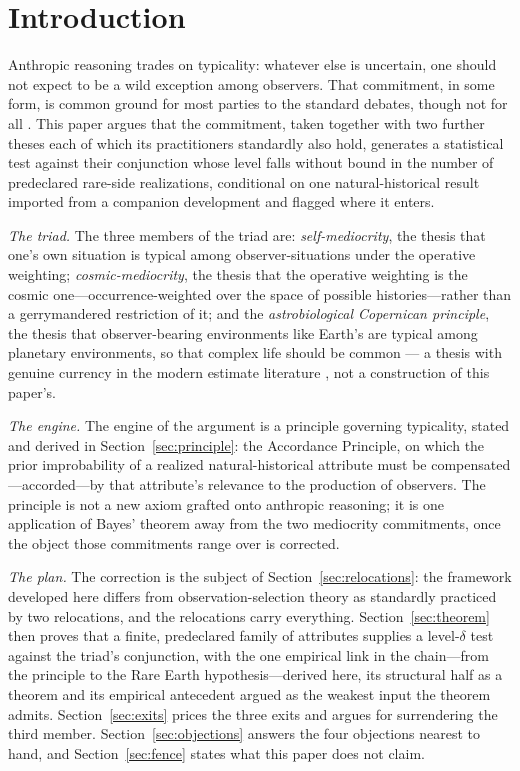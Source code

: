 \section{Introduction}
\label{sec:intro}

Anthropic reasoning trades on typicality: whatever else is uncertain, one should not expect to be a wild exception among observers. That commitment, in some form, is common ground for most parties to the standard debates, though not for all \cite{hartle2007typical}. This paper argues that the commitment, taken together with two further theses each of which its practitioners standardly also hold, generates a statistical test against their conjunction whose level falls without bound in the number of predeclared rare-side realizations, conditional on one natural-historical result imported from a companion development and flagged where it enters.

\textit{The triad.} The three members of the triad are: \emph{self-mediocrity}, the thesis that one's own situation is typical among observer-situations under the operative weighting; \emph{cosmic-mediocrity}, the thesis that the operative weighting is the cosmic one---occurrence-weighted over the space of possible histories---rather than a gerrymandered restriction of it; and the \emph{astrobiological Copernican principle}, the thesis that observer-bearing environments like Earth's are typical among planetary environments, so that complex life should be common --- a thesis with genuine currency in the modern estimate literature \cite{westby2020astrobiological}, not a construction of this paper's.



\textit{The engine.} The engine of the argument is a principle governing typicality, stated and derived in Section~\ref{sec:principle}: the Accordance Principle, on which the prior improbability of a realized natural-historical attribute must be compensated---accorded---by that attribute's relevance to the production of observers. The principle is not a new axiom grafted onto anthropic reasoning; it is one application of Bayes' theorem away from the two mediocrity commitments, once the object those commitments range over is corrected.

\textit{The plan.} The correction is the subject of Section~\ref{sec:relocations}: the framework developed here differs from observation-selection theory as standardly practiced by two relocations, and the relocations carry everything. Section~\ref{sec:theorem} then proves that a finite, predeclared family of attributes supplies a level-$\delta$ test against the triad's conjunction, with the one empirical link in the chain---from the principle to the Rare Earth hypothesis---derived here, its structural half as a theorem and its empirical antecedent argued as the weakest input the theorem admits. Section~\ref{sec:exits} prices the three exits and argues for surrendering the third member. Section~\ref{sec:objections} answers the four objections nearest to hand, and Section~\ref{sec:fence} states what this paper does not claim.

